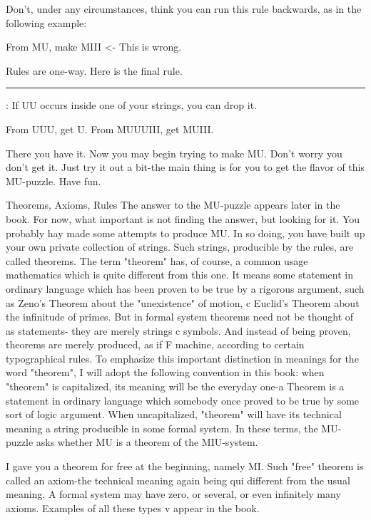 Don't, under any circumstances, think you can run this rule backwards, as in the following example: 





From MU, make MIII               <- This is wrong. 

Rules are one-way. Here is the final rule. 


\rule IV: If UU occurs inside one of your strings, you can drop it.\par


From UUU, get U. From MUUUIII, get MUIII. 

There you have it. Now you may begin trying to make MU. Don't worry you don't get it. Just try it out a bit-the main thing is for you to get the flavor of this MU-puzzle. Have fun. 

Theorems, Axioms, Rules The answer to the MU-puzzle appears later in the book. For now, what important is not finding the answer, but looking for it. You probably hay made some attempts to produce MU. In so doing, you have built up your own private collection of strings. Such strings, producible by the rules, are called theorems. The term "theorem" has, of course, a common usage mathematics which is quite different from this one. It means some statement in ordinary language which has been proven to be true by a rigorous argument, such as Zeno's Theorem about the "unexistence" of motion, c Euclid's Theorem about the infinitude of primes. But in formal system theorems need not be thought of as statements- they are merely strings c symbols. And instead of being proven, theorems are merely produced, as if F machine, according to certain typographical rules. To emphasize this important distinction in meanings for the word "theorem", I will adopt the following convention in this book: when "theorem" is capitalized, its meaning will be the everyday one-a Theorem is a statement in ordinary language which somebody once proved to be true by some sort of logic argument. When uncapitalized, "theorem" will have its technical meaning a string producible in some formal system. In these terms, the MU- puzzle asks whether MU is a theorem of the MIU-system. 

I gave you a theorem for free at the beginning, namely MI. Such "free" theorem is called an axiom-the technical meaning again being qui different from the usual meaning. A formal system may have zero, or several, or even infinitely many axioms. Examples of all these types v appear in the book. 

